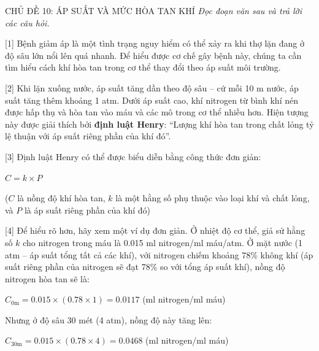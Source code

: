 \documentclass[12pt,a4paper,twoside]{article}
\newenvironment{readingpassage}[1][]{%
    \begin{tcolorbox}[enhanced, colback=grayLight, colframe=secondaryBlue,
        coltitle=textDark, fonttitle=\bfseries, title={#1},
        rounded corners, arc=3mm, boxrule=1pt,
        left=15pt, right=15pt, top=10pt, bottom=10pt,
        breakable, before skip=10pt, after skip=10pt, drop fuzzy shadow]
    \setstretch{1.3}
}{\end{tcolorbox}}
\begin{document}
\label{b1_cd10}
\begin{topicbox}{\large CHỦ ĐỀ 10: ÁP SUẤT VÀ MỨC HÒA TAN KHÍ}
\vspace{8pt}
\textit{Đọc đoạn văn sau và trả lời các câu hỏi.}
\end{topicbox}
\vspace{5pt}
\begin{readingpassage}[]


[1] Bệnh giảm áp là một tình trạng nguy hiểm có thể xảy ra khi thợ lặn đang ở độ sâu lớn nổi lên quá nhanh. Để hiểu được cơ chế gây bệnh này, chúng ta cần tìm hiểu cách khí hòa tan trong cơ thể thay đổi theo áp suất môi trường.

[2] Khi lặn xuống nước, áp suất tăng dần theo độ sâu -- cứ mỗi 10 m nước, áp suất tăng thêm khoảng 1 atm. Dưới áp suất cao, khí nitrogen từ bình khí nén được hấp thụ và hòa tan vào máu và các mô trong cơ thể nhiều hơn. Hiện tượng này được giải thích bởi \textbf{định luật Henry}: ``Lượng khí hòa tan trong chất lỏng tỷ lệ thuận với áp suất riêng phần của khí đó''.

[3] Định luật Henry có thể được biểu diễn bằng công thức đơn giản:

\vspace{2pt}
\begin{center}
$C = k \times P$
\end{center}
\vspace{2pt}

($C$ là nồng độ khí hòa tan, $k$ là một hằng số phụ thuộc vào loại khí và chất lỏng, và $P$ là áp suất riêng phần của khí đó)

[4] Để hiểu rõ hơn, hãy xem một ví dụ đơn giản. Ở nhiệt độ cơ thể, giả sử hằng số $k$ cho nitrogen trong máu là 0.015 ml nitrogen/ml máu/atm. Ở mặt nước (1 atm -- áp suất tổng tất cả các khí), với nitrogen chiếm khoảng 78\% không khí (áp suất riêng phần của nitrogen sẽ đạt 78\% so với tổng áp suất khí), nồng độ nitrogen hòa tan sẽ là:

\vspace{2pt}
\begin{center}
$C_{\text{0m}} = 0.015 \times (0.78 \times 1) = 0.0117$ (ml nitrogen/ml máu)
\end{center}
\vspace{2pt}

Nhưng ở độ sâu 30 mét (4 atm), nồng độ này tăng lên:

\vspace{2pt}
\begin{center}
$C_{\text{30m}} = 0.015 \times (0.78 \times 4) = 0.0468$ (ml nitrogen/ml máu)
\end{center}
\vspace{2pt}


\end{readingpassage}
\end{document}
